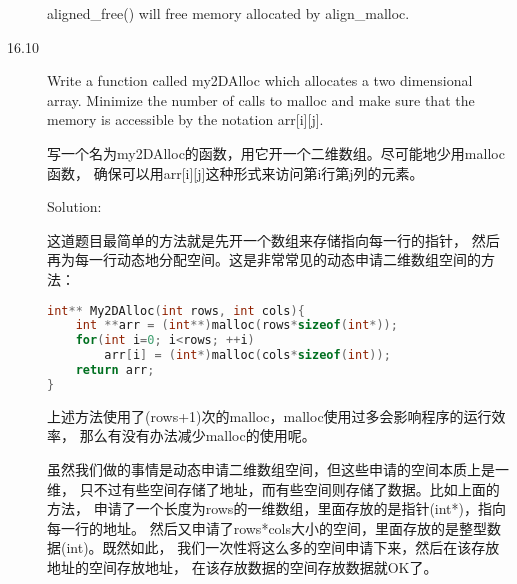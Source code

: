 \begin{description}
aligned\_free() will free memory allocated by align\_malloc.
%

\item[16.10] Write a function called my2DAlloc which allocates a two dimensional array. Minimize the number of calls to malloc and make sure that the memory is accessible by the notation arr[i][j].

写一个名为my2DAlloc的函数，用它开一个二维数组。尽可能地少用malloc函数， 确保可以用arr[i][j]这种形式来访问第i行第j列的元素。

Solution: 

这道题目最简单的方法就是先开一个数组来存储指向每一行的指针， 然后再为每一行动态地分配空间。这是非常常见的动态申请二维数组空间的方法：
\begin{lstlisting}[language=C++]
int** My2DAlloc(int rows, int cols){
    int **arr = (int**)malloc(rows*sizeof(int*));
    for(int i=0; i<rows; ++i)
        arr[i] = (int*)malloc(cols*sizeof(int));
    return arr;
}
\end{lstlisting}
上述方法使用了(rows+1)次的malloc，malloc使用过多会影响程序的运行效率， 那么有没有办法减少malloc的使用呢。

虽然我们做的事情是动态申请二维数组空间，但这些申请的空间本质上是一维， 只不过有些空间存储了地址，而有些空间则存储了数据。比如上面的方法， 申请了一个长度为rows的一维数组，里面存放的是指针(int*)，指向每一行的地址。 然后又申请了rows*cols大小的空间，里面存放的是整型数据(int)。既然如此， 我们一次性将这么多的空间申请下来，然后在该存放地址的空间存放地址， 在该存放数据的空间存放数据就OK了。


\end{description}
